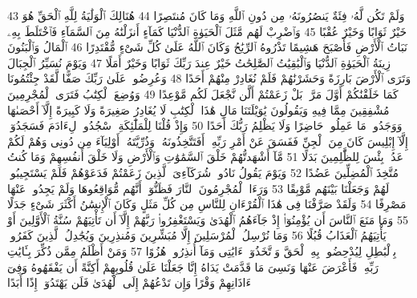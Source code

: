 {\tiny\colorbox{cl_aya}{43}} وَلَمْ تَكُن لَّهُۥ فِئَةٌ يَنصُرُونَهُۥ مِن دُونِ ٱللَّهِ وَمَا كَانَ مُنتَصِرًا
{\tiny\colorbox{cl_aya}{44}} هُنَالِكَ ٱلْوَلَٰيَةُ لِلَّهِ ٱلْحَقِّ هُوَ خَيْرٌ ثَوَابًا وَخَيْرٌ عُقْبًا
{\tiny\colorbox{cl_aya}{45}} وَٱضْرِبْ لَهُم مَّثَلَ ٱلْحَيَوٰةِ ٱلدُّنْيَا كَمَآءٍ أَنزَلْنَٰهُ مِنَ ٱلسَّمَآءِ فَٱخْتَلَطَ بِهِۦ نَبَاتُ ٱلْأَرْضِ فَأَصْبَحَ هَشِيمًا تَذْرُوهُ ٱلرِّيَٰحُ وَكَانَ ٱللَّهُ عَلَىٰ كُلِّ شَىْءٍ مُّقْتَدِرًا
{\tiny\colorbox{cl_aya}{46}} ٱلْمَالُ وَٱلْبَنُونَ زِينَةُ ٱلْحَيَوٰةِ ٱلدُّنْيَا وَٱلْبَٰقِيَٰتُ ٱلصَّٰلِحَٰتُ خَيْرٌ عِندَ رَبِّكَ ثَوَابًا وَخَيْرٌ أَمَلًا
{\tiny\colorbox{cl_aya}{47}} وَيَوْمَ نُسَيِّرُ ٱلْجِبَالَ وَتَرَى ٱلْأَرْضَ بَارِزَةً وَحَشَرْنَٰهُمْ فَلَمْ نُغَادِرْ مِنْهُمْ أَحَدًا
{\tiny\colorbox{cl_aya}{48}} وَعُرِضُوا۟ عَلَىٰ رَبِّكَ صَفًّا لَّقَدْ جِئْتُمُونَا كَمَا خَلَقْنَٰكُمْ أَوَّلَ مَرَّةٍۭ بَلْ زَعَمْتُمْ أَلَّن نَّجْعَلَ لَكُم مَّوْعِدًا
{\tiny\colorbox{cl_aya}{49}} وَوُضِعَ ٱلْكِتَٰبُ فَتَرَى ٱلْمُجْرِمِينَ مُشْفِقِينَ مِمَّا فِيهِ وَيَقُولُونَ يَٰوَيْلَتَنَا مَالِ هَٰذَا ٱلْكِتَٰبِ لَا يُغَادِرُ صَغِيرَةً وَلَا كَبِيرَةً إِلَّآ أَحْصَىٰهَا وَوَجَدُوا۟ مَا عَمِلُوا۟ حَاضِرًا وَلَا يَظْلِمُ رَبُّكَ أَحَدًا
{\tiny\colorbox{cl_aya}{50}} وَإِذْ قُلْنَا لِلْمَلَٰٓئِكَةِ ٱسْجُدُوا۟ لِءَادَمَ فَسَجَدُوٓا۟ إِلَّآ إِبْلِيسَ كَانَ مِنَ ٱلْجِنِّ فَفَسَقَ عَنْ أَمْرِ رَبِّهِۦٓ أَفَتَتَّخِذُونَهُۥ وَذُرِّيَّتَهُۥٓ أَوْلِيَآءَ مِن دُونِى وَهُمْ لَكُمْ عَدُوٌّۢ بِئْسَ لِلظَّٰلِمِينَ بَدَلًا
{\tiny\colorbox{cl_aya}{51}} مَّآ أَشْهَدتُّهُمْ خَلْقَ ٱلسَّمَٰوَٰتِ وَٱلْأَرْضِ وَلَا خَلْقَ أَنفُسِهِمْ وَمَا كُنتُ مُتَّخِذَ ٱلْمُضِلِّينَ عَضُدًا
{\tiny\colorbox{cl_aya}{52}} وَيَوْمَ يَقُولُ نَادُوا۟ شُرَكَآءِىَ ٱلَّذِينَ زَعَمْتُمْ فَدَعَوْهُمْ فَلَمْ يَسْتَجِيبُوا۟ لَهُمْ وَجَعَلْنَا بَيْنَهُم مَّوْبِقًا
{\tiny\colorbox{cl_aya}{53}} وَرَءَا ٱلْمُجْرِمُونَ ٱلنَّارَ فَظَنُّوٓا۟ أَنَّهُم مُّوَاقِعُوهَا وَلَمْ يَجِدُوا۟ عَنْهَا مَصْرِفًا
{\tiny\colorbox{cl_aya}{54}} وَلَقَدْ صَرَّفْنَا فِى هَٰذَا ٱلْقُرْءَانِ لِلنَّاسِ مِن كُلِّ مَثَلٍ وَكَانَ ٱلْإِنسَٰنُ أَكْثَرَ شَىْءٍ جَدَلًا
{\tiny\colorbox{cl_aya}{55}} وَمَا مَنَعَ ٱلنَّاسَ أَن يُؤْمِنُوٓا۟ إِذْ جَآءَهُمُ ٱلْهُدَىٰ وَيَسْتَغْفِرُوا۟ رَبَّهُمْ إِلَّآ أَن تَأْتِيَهُمْ سُنَّةُ ٱلْأَوَّلِينَ أَوْ يَأْتِيَهُمُ ٱلْعَذَابُ قُبُلًا
{\tiny\colorbox{cl_aya}{56}} وَمَا نُرْسِلُ ٱلْمُرْسَلِينَ إِلَّا مُبَشِّرِينَ وَمُنذِرِينَ وَيُجَٰدِلُ ٱلَّذِينَ كَفَرُوا۟ بِٱلْبَٰطِلِ لِيُدْحِضُوا۟ بِهِ ٱلْحَقَّ وَٱتَّخَذُوٓا۟ ءَايَٰتِى وَمَآ أُنذِرُوا۟ هُزُوًا
{\tiny\colorbox{cl_aya}{57}} وَمَنْ أَظْلَمُ مِمَّن ذُكِّرَ بِـَٔايَٰتِ رَبِّهِۦ فَأَعْرَضَ عَنْهَا وَنَسِىَ مَا قَدَّمَتْ يَدَاهُ إِنَّا جَعَلْنَا عَلَىٰ قُلُوبِهِمْ أَكِنَّةً أَن يَفْقَهُوهُ وَفِىٓ ءَاذَانِهِمْ وَقْرًا وَإِن تَدْعُهُمْ إِلَى ٱلْهُدَىٰ فَلَن يَهْتَدُوٓا۟ إِذًا أَبَدًا
